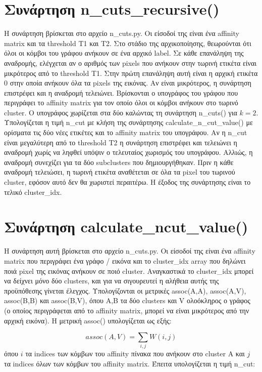 \documentclass{article}
\begin{document}
\section{Συνάρτηση n\_cuts\_recursive()}
Η συνάρτηση βρίσκεται στο αρχείο n\_cuts.py. Οι είσοδοί της είναι ένα affinity matrix 
και τα threshold T1 και T2. Στο στάδιο της αρχικοποίησης, θεωρούνται ότι όλοι
οι κόμβοι του γράφου ανήκουν σε ένα αρχικό label. Σε κάθε επανάληψη της αναδρομής,
ελέγχεται αν ο αριθμός των pixels που ανήκουν στην τωρινή ετικέτα είναι μικρότερος
από το threshold T1. Στην πρώτη επανάληψη αυτή είναι η αρχική ετικέτα 0 στην οποία 
ανήκουν όλα τα pixels της εικόνας. Αν είναι μικρότερος, η συνάρτηση επιστρέφει 
και η αναδρομή τελειώνει. Βρίσκονται ο υπογράφος του γράφου που περιγράφει το
affinity matrix για τον οποίο όλοι οι κόμβοι ανήκουν στο τωρινό cluster. Ο
υπογράφος χωρίζεται στα δύο καλώντας τη συνάρτηση n\_cuts() για $k=2$. 
Υπολογίζεται η τιμή n\_cut με κλήση της συνάρτησης calculate\_n\_cut\_value()
με ορίσματα τις δύο νέες ετικέτες και το affinity matrix του υπογράφου.
Αν η n\_cut είναι μεγαλύτερη από το threshold T2 η συνάρτηση επιστρέφει και τελειώνει η
αναδρομή χωρίς να ληφθεί υπόψιν ο τελευταίος χωρισμός του υπογράφου. Αλλιώς,
η αναδρομή συνεχίζει για τα δύο subclusters που δημιουργήθηκαν. Πριν η 
κάθε αναδρομή τελειώσει, η τωρινή ετικέτα αναθέτεται σε όλα τα pixel
του τωρινού cluster, εφόσον αυτό δεν θα χωριστεί περαιτέρω. Η έξοδος της
συνάρτησης είναι το τελικό cluster\_idx.

\section{Συνάρτηση calculate\_ncut\_value()}
Η συνάρτηση αυτή βρίσκεται στο αρχείο n\_cuts.py. Οι είσοδοί της είναι ένα 
affinity matrix που περιγράφει ένα γράφο / εικόνα και το cluster\_idx array 
που δηλώνει ποιά pixel της εικόνας ανήκουν σε ποιό cluster. Αναγκαστικά το
cluster\_idx μπορεί να δείχνει μόνο δύο clusters, και για να σιγουρευτεί η
αλήθεια αυτής της προϋπόθεσης γίνεται έλεγχος. Υπολογίζονται οι 
μετρικές assoc(A,A), assoc(A,V), assoc(B,B) και assoc(B,V), όπου A,B τα δύο
clusters και V ολοόκληρος ο γράφος (ο οποίος περιγράφεται από το affinity
matrix, μπορεί να είναι μικρότερος από την αρχική εικόνα). Η μετρική assoc()
υπολογίζεται ως εξής:

\begin{equation}
    assoc(A,V) = \sum_{i, j} W(i, j)
\end{equation}
όπου $i$ τα indices των κόμβων του affinity πίνακα που ανήκουν στο cluster A
και $j$ τα indices όλων των κόμβων του affinity matrix. Έπειτα υπολογίζεται η 
τιμή n\_cut:
\end{document}

